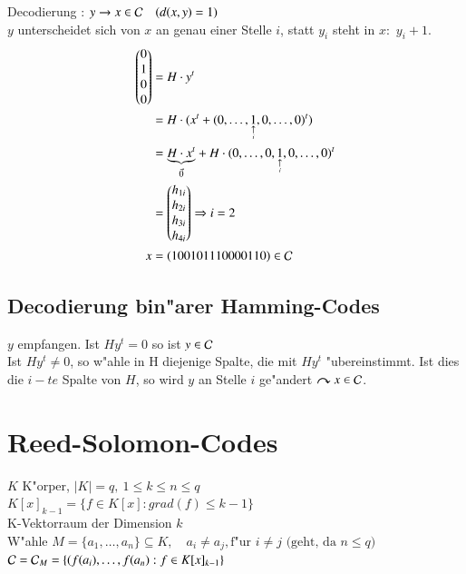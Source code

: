 \begin{enumerate}[a)]
\[	\]
	Decodierung : $y \rightarrow x \in \mathcal{C}\quad (d(x,y)=1)$\\
	$y$ unterscheidet sich von $x$ an genau einer Stelle $i$, statt $y_i$ steht in $x:$ $y_i+1$.
	\begin{align*}
		\begin{pmatrix}
			0 \\ 1 \\ 0 \\ 0
		\end{pmatrix}
		&=H\cdot y^t \\
		&=H \cdot (x^t + (0,\ldots,\underset{\underset{i}{\uparrow}}{1},0,\ldots,0)^t) \\
		&=
		\underset{\vec{0}}{\underbrace{H \cdot x^t}} + H \cdot (0,\ldots,0,\underset{\underset{i}{\uparrow}}{1},0,\ldots,0)^{t} \\
		&= 
		\begin{pmatrix}
			h_{1i} \\ h_{2i} \\ h_{3i} \\ h_{4i}
		\end{pmatrix}\Rightarrow i=2\\
		x&=(100101110000110) \in \mathcal{C}
	\end{align*}

\end{enumerate}
\subsection{Decodierung bin"arer Hamming-Codes}
$y$ empfangen. Ist $H y^t=0$ so ist $y \in \mathcal{C}$\\%
Ist $Hy^t \neq 0$, so w"ahle in H diejenige Spalte, die mit $Hy^t$ "ubereinstimmt. Ist dies die $i-te$ Spalte von $H$, so wird $y$ an Stelle $i$ ge"andert $\curvearrowright x \in \mathcal{C}$.
\section{Reed-Solomon-Codes}
$K$ K"orper, $\left| K \right|=q,\ 1 \leq k \leq n \leq q$\\
$K[x]_{k-1}=\lbrace f \in K[x] : grad(f) \leq k-1 \rbrace$\\
K-Vektorraum der Dimension $k$\\
W"ahle $M= \lbrace a_1,\ldots,a_n \rbrace \subseteq K,\quad a_i \neq a_j, \text{f"ur } i \neq j\text{ (geht, da } n \leq q)$\\
$\mathcal{C} = \mathcal{C}_M = \lbrace (f(a_i),\ldots,f(a_n) : f \in K[x]_{k-1} \rbrace$
